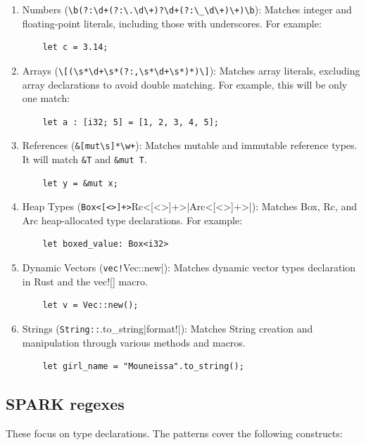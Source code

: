 \documentclass[nomenclature, english, bibtex]{kththesis}
\begin{document}
\begin{enumerate}
    \item Numbers (\verb|\b(?:\d+(?:\.\d\+)?\d+(?:\_\d\+)\+)\b|): Matches integer and floating-point literals, including those with underscores. For example:
    \begin{verbatim}
    let c = 3.14;
    \end{verbatim}
    \item Arrays (\verb|\[(\s*\d+\s*(?:,\s*\d+\s*)*)\]|): Matches array literals, excluding array declarations to avoid double matching. For example, this will be only one match:
    \begin{verbatim}
    let a : [i32; 5] = [1, 2, 3, 4, 5];  
    \end{verbatim}
    \item References (\verb|&[mut\s]*\w+|): Matches mutable and immutable reference types. It will match \texttt{\&T} and \texttt{\&mut T}.
    \begin{verbatim}
    let y = &mut x;  
    \end{verbatim}
    \item Heap Types (\verb|Box<[<>]+>|Rc<[<>]+>|Arc<[<>]+>|): Matches Box, Rc, and Arc heap-allocated type declarations. For example:
    \begin{verbatim}
    let boxed_value: Box<i32>
    \end{verbatim}
    \item Dynamic Vectors (\verb|vec!|Vec::new|): Matches dynamic vector types declaration in Rust and the vec![] macro.
    \begin{verbatim}
    let v = Vec::new();
    \end{verbatim}
    \item Strings (\verb|String::|.to\_string|format!|): Matches String creation and manipulation through various methods and macros.
    \begin{verbatim}
    let girl_name = "Mouneissa".to_string();
    \end{verbatim}
\end{enumerate}
 
\subsection{SPARK regexes}

These focus on type declarations.
The patterns cover the following constructs:
\end{document}
